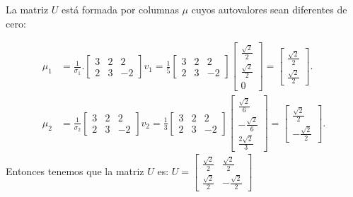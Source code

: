 \begin{frame}
	\begin{solution}
		La matriz $U$ está formada por columnas $\mu$ cuyos autovalores sean diferentes de cero:

		\begin{align*}
			\mu_{1} & =
			\frac{1}{\sigma_{1}}.
			\begin{bmatrix}
				3 & 2 & 2  \\
				2 & 3 & -2
			\end{bmatrix}
			v_{1}=
			\frac{1}{5}
			\begin{bmatrix}
				3 & 2 & 2  \\
				2 & 3 & -2
			\end{bmatrix}
			\begin{bmatrix}
				\frac{\sqrt{2}}{2} \\
				\frac{\sqrt{2}}{2} \\
				0
			\end{bmatrix}=
			\begin{bmatrix}
				\frac{\sqrt{2}}{2} \\
				\frac{\sqrt{2}}{2}
			\end{bmatrix}. \\
			\mu_{2} & =
			\frac{1}{\sigma_{2}}
			\begin{bmatrix}
				3 & 2 & 2  \\
				2 & 3 & -2
			\end{bmatrix}v_{2}=
			\frac{1}{3}
			\begin{bmatrix}
				3 & 2 & 2  \\
				2 & 3 & -2
			\end{bmatrix}
			\begin{bmatrix}
				\frac{\sqrt{2}}{6}  \\
				-\frac{\sqrt{2}}{6} \\
				\frac{2\sqrt{2}}{3}
			\end{bmatrix}=
			\begin{bmatrix}
				\frac{\sqrt{2}}{2} \\
				-\frac{\sqrt{2}}{2}
			\end{bmatrix}.
		\end{align*}
		Entonces tenemos que la matriz $U$ es:
		\begin{math}
			U =
			\begin{bmatrix}
				\frac{\sqrt{2}}{2} & \frac{\sqrt{2}}{2}  \\
				\frac{\sqrt{2}}{2} & -\frac{\sqrt{2}}{2}
			\end{bmatrix}
		\end{math}


\end{solution}
\end{frame}
